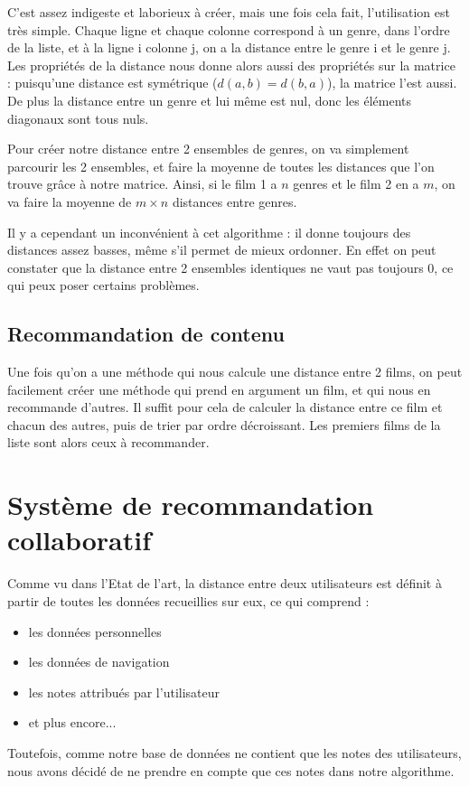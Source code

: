 \documentclass{report}
\begin{document}
\normalsize
C'est assez indigeste et laborieux à créer, mais une fois cela fait, l'utilisation est très simple. Chaque ligne et chaque colonne correspond à un genre, dans l'ordre de la liste, et à la ligne i colonne j, on a la distance entre le genre i et le genre j. Les propriétés de la distance nous donne alors aussi des propriétés sur la matrice : puisqu'une distance est symétrique (\(d(a,b)=d(b,a)\)), la matrice l'est aussi. De plus la distance entre un genre et lui même est nul, donc les éléments diagonaux sont tous nuls.\par
Pour créer notre distance entre 2 ensembles de genres, on va simplement parcourir les 2 ensembles, et faire la moyenne de toutes les distances que l'on trouve grâce à notre matrice. Ainsi, si le film 1 a $n$ genres et le film 2 en a $m$, on va faire la moyenne de $m\times n$ distances entre genres.\par
Il y a cependant un inconvénient à cet algorithme : il donne toujours des distances assez basses, même s'il permet de mieux ordonner. En effet on peut constater que la distance entre 2 ensembles identiques ne vaut pas toujours 0, ce qui peux poser certains problèmes.

\subsection{Recommandation de contenu}
Une fois qu'on a une méthode qui nous calcule une distance entre 2 films, on peut facilement créer une méthode qui prend en argument un film, et qui nous en recommande d'autres. Il suffit pour cela de calculer la distance entre ce film et chacun des autres, puis de trier par ordre décroissant. Les premiers films de la liste sont alors ceux à recommander.

\section{Système de recommandation collaboratif}
Comme vu dans l'Etat de l'art, la distance entre deux utilisateurs est définit à partir de toutes les données recueillies sur eux, ce qui comprend :
\begin{itemize}
	\item les données personnelles
	\item les données de navigation
	\item les notes attribués par l'utilisateur
	\item et plus encore...
\end{itemize}
Toutefois, comme notre base de données ne contient que les notes des utilisateurs, nous avons décidé de ne prendre en compte que ces notes dans notre algorithme.
\end{document}
